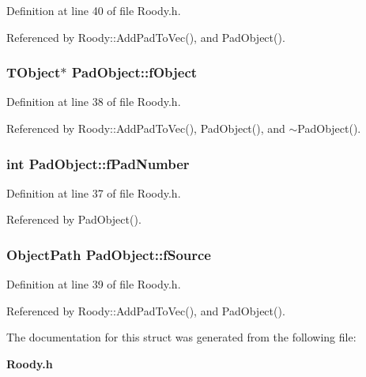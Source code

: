 Definition at line 40 of file Roody.h.



Referenced by Roody::AddPadToVec(), and PadObject().

\subsubsection[{fObject}]{\setlength{\rightskip}{0pt plus 5cm}TObject$\ast$ {\bf PadObject::fObject}}\label{structPadObject_a8032e91fa662ac8f50a13350083d401d}


Definition at line 38 of file Roody.h.



Referenced by Roody::AddPadToVec(), PadObject(), and $\sim$PadObject().

\subsubsection[{fPadNumber}]{\setlength{\rightskip}{0pt plus 5cm}int {\bf PadObject::fPadNumber}}\label{structPadObject_a78bdb3cf0d4a4dcf1f22900548ebe7b0}


Definition at line 37 of file Roody.h.



Referenced by PadObject().

\subsubsection[{fSource}]{\setlength{\rightskip}{0pt plus 5cm}ObjectPath {\bf PadObject::fSource}}\label{structPadObject_ab27c0263b342ca18b2f7bc498d8b3f92}


Definition at line 39 of file Roody.h.



Referenced by Roody::AddPadToVec(), and PadObject().



The documentation for this struct was generated from the following file:\begin{DoxyCompactItemize}
\item 
{\bf Roody.h}\end{DoxyCompactItemize}

